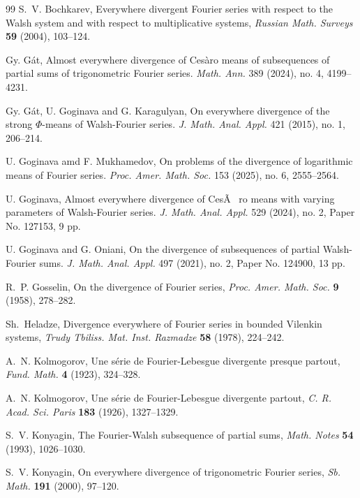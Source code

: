 \documentclass[11pt]{amsart}
\numberwithin{equation}{section}
\theoremstyle{plain}
\begin{document}
\begin{thebibliography}{99}
 S.~V. Bochkarev, Everywhere divergent Fourier series
with respect to the Walsh system and with respect to multiplicative systems, 
\emph{Russian Math. Surveys} \textbf{59} (2004), 103--124.

 Gy. G\'at, Almost everywhere divergence of Ces\`aro means of
subsequences of partial sums of trigonometric Fourier series. \emph{Math.
Ann.} 389 (2024), no. 4, 4199--4231.

 Gy. G\'at, U. Goginava and G. Karagulyan, On everywhere
divergence of the strong $\Phi$-means of Walsh-Fourier series. \emph{J.
Math. Anal. Appl.} 421 (2015), no. 1, 206--214.

 U. Goginava amd F. Mukhamedov, On problems of the
divergence of logarithmic means of Fourier series. \emph{Proc. Amer. Math.
Soc.} 153 (2025), no. 6, 2555--2564.

 U. Goginava, Almost everywhere divergence of Ces\~{A}~%
ro means with varying parameters of Walsh-Fourier series. \emph{J. Math.
Anal. Appl.} 529 (2024), no. 2, Paper No. 127153, 9 pp.

 U. Goginava and G. Oniani, On the divergence of
subsequences of partial Walsh-Fourier sums. \emph{J. Math. Anal. Appl.} 497
(2021), no. 2, Paper No. 124900, 13 pp.

 R.~P. Gosselin, On the divergence of Fourier series, 
\emph{Proc. Amer. Math. Soc.} \textbf{9} (1958), 278--282.

 Sh.~Heladze, Divergence everywhere of Fourier series in
bounded Vilenkin systems, \emph{Trudy Tbiliss. Mat. Inst. Razmadze} \textbf{%
58} (1978), 224--242.

 A.~N. Kolmogorov, Une s\'erie de Fourier-Lebesgue
divergente presque partout, \emph{Fund. Math.} \textbf{4} (1923), 324--328.

 A.~N. Kolmogorov, Une s\'erie de
Fourier-Lebesgue divergente partout, \emph{C. R. Acad. Sci. Paris} \textbf{%
183} (1926), 1327--1329.

 S.~V. Konyagin, The Fourier-Walsh subsequence of
partial sums, \emph{Math. Notes} \textbf{54} (1993), 1026--1030.

 S.~V. Konyagin, On everywhere divergence of
trigonometric Fourier series, \emph{Sb. Math.} \textbf{191} (2000), 97--120.


\end{thebibliography}
\end{document}
